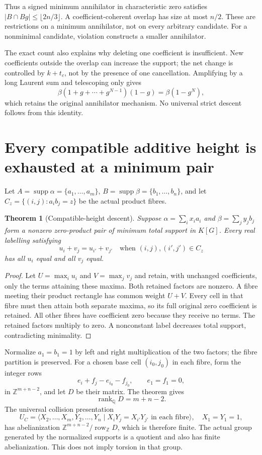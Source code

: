 \documentclass[11pt,a4paper,oneside]{report}
\newtheorem{theorem}{Theorem}[section]
\theoremstyle{definition}
\theoremstyle{remark}
\DeclareMathOperator{\supp}{supp}
\DeclareMathOperator{\rank}{rank}
\newcommand{\Q}{\mathbb Q}
\newcommand{\Z}{\mathbb Z}
\begin{document}
Thus a signed minimum annihilator in characteristic zero satisfies
$|B\cap Bg|\le\lfloor2n/3\rfloor$. A coefficient-coherent overlap
has size at most $n/2$. These are restrictions on a minimum
annihilator, not on every arbitrary candidate. For a nonminimal
candidate, violation constructs a smaller annihilator.

The exact count also explains why deleting one coefficient is
insufficient. New coefficients outside the overlap can increase
the support; the net change is controlled by $k+t_c$, not by
the presence of one cancellation. Amplifying by a long Laurent
sum and telescoping only gives
\[
\beta(1+g+\cdots+g^{N-1})(1-g)=\beta(1-g^N),
\]
which retains the original annihilator mechanism. No universal
strict descent follows from this identity.

\section{Every compatible additive height is exhausted at a minimum pair}

Let $A=\supp\alpha=\{a_1,\ldots,a_m\}$,
$B=\supp\beta=\{b_1,\ldots,b_n\}$, and let
$C_z=\{(i,j):a_i b_j=z\}$ be the actual product fibres.

\begin{theorem}[Compatible-height descent]\label{M08:thm:height}
Suppose $\alpha=\sum_i x_i a_i$ and $\beta=\sum_jy_jb_j$
form a nonzero zero-product pair of minimum total support in
$K[G]$. Every real labelling satisfying
\[
u_i+v_j=u_{i'}+v_{j'}\quad
\text{when }(i,j),(i',j')\in C_z
\]
has all $u_i$ equal and all $v_j$ equal.
\end{theorem}
\begin{proof}
Let $U=\max_i u_i$ and $V=\max_j v_j$ and retain, with unchanged
coefficients, only the terms attaining these maxima. Both retained
factors are nonzero. A fibre meeting their product rectangle has
common weight $U+V$. Every cell in that fibre must then attain
both separate maxima, so its full original zero coefficient is
retained. All other fibres have coefficient zero because they
receive no terms. The retained factors multiply to zero. A
nonconstant label decreases total support, contradicting minimality.
\end{proof}

Normalize $a_1=b_1=1$ by left and right multiplication of the two
factors; the fibre partition is preserved. For a chosen base cell
$(i_0,j_0)$ in each fibre, form the integer rows
\[
e_i+f_j-e_{i_0}-f_{j_0},\qquad e_1=f_1=0,
\]
in $\Z^{m+n-2}$, and let $D$ be their matrix. The theorem gives
\begin{equation}\label{M08:eq:rank}
\boxed{\rank_{\Q}D=m+n-2.}
\end{equation}
The universal collision presentation
\[
U_C=\langle X_2,\ldots,X_m,Y_2,\ldots,Y_n\mid
X_iY_j=X_{i'}Y_{j'}\text{ in each fibre}\rangle,
\quad X_1=Y_1=1,
\]
has abelianization $\Z^{m+n-2}/\operatorname{row}_{\Z}D$,
which is therefore finite. The actual group generated by the
normalized supports is a quotient and also has finite abelianization.
This does not imply torsion in that group.
\end{document}
